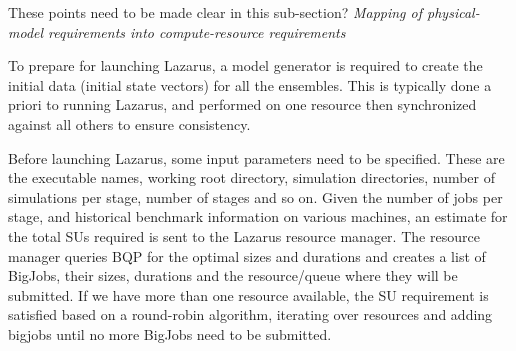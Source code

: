 \documentclass[conference,final]{IEEEtran}
\begin{document}

These points need to be made clear in this sub-section? \newline
 {\it Mapping of physical-model
  requirements into compute-resource requirements} \newline


To prepare for launching Lazarus, a model generator is required to create
the initial data (initial state vectors) for all the ensembles. This is typically
done a priori to running Lazarus, and performed on one resource then synchronized
against all others to ensure consistency.

Before launching Lazarus, some input parameters need to be specified.
These are the executable names, working root directory, simulation directories,
number of simulations per stage, number of stages and so on. Given 
the number of jobs per stage, and historical benchmark information on various
machines, an estimate for the total SUs required is sent to the Lazarus
resource manager. The resource manager queries BQP for the optimal sizes and durations
and creates a list of BigJobs, their sizes, durations and the resource/queue
where they will be submitted. If we have more than one resource available, the SU
requirement is satisfied based on a round-robin algorithm, iterating over
resources and adding bigjobs until no more BigJobs need to be submitted.
\end{document}
